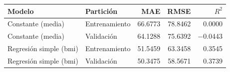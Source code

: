 \begin{tabular}{llrrr}
\toprule
Modelo & Partición & MAE & RMSE & $R^2$ \\
\midrule
Constante (media) & Entrenamiento & 66.6773 & 78.8462 & 0.0000 \\
Constante (media) & Validación & 64.1288 & 75.6392 & $-$0.0443 \\
Regresión simple (bmi) & Entrenamiento & 51.5459 & 63.3458 & 0.3545 \\
Regresión simple (bmi) & Validación & 50.3475 & 58.5671 & 0.3739 \\
\bottomrule
\end{tabular}
